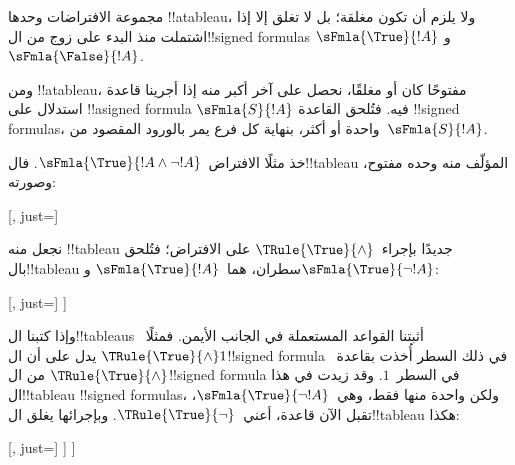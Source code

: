 \documentclass[../../../include/open-logic-section]{subfiles}
\begin{document}
\begin{ex}
  مجموعة الافتراضات وحدها !!a{tableau}، ولا يلزم أن تكون مغلقة؛
  بل لا تغلق إلا إذا اشتملت منذ البدء على زوج من ال!!{signed formula}s
  $\sFmla{\True}{!A}$ و$\sFmla{\False}{!A}$.

  ومن !!a{tableau}، مفتوحًا كان أو مغلقًا، نحصل على آخر أكبر منه
  إذا أجرينا قاعدة استدلال على !!a{signed formula}
  $\sFmla{S}{!A}$ فيه. فتُلحق القاعدة !!{signed formula}s، واحدة
  أو أكثر، بنهاية كل فرع يمر بالورود المقصود من~$\sFmla{S}{!A}$.


  خذ مثلًا الافتراض~$\sFmla{\True}{!A \land \lnot !A}$.
  فال!!{tableau} المؤلّف منه وحده مفتوح، وصورته:
  \begin{center}
    \begin{tableau}{}
      [, just=\TAss]
    \end{tableau}{}
  \end{center}
  نجعل منه !!{tableau} جديدًا بإجراء~$\TRule{\True}{\land}$
  على الافتراض؛ فتُلحق بال!!{tableau} سطران،
  هما~$\sFmla{\True}{!A}$ و$\sFmla{\True}{\lnot !A}$:
  \begin{center}
    \begin{tableau}{}
      [, just=\TAss
        [\sFmla{\True}{\formula{A}}, just={\TRule{\True}{\land}[1]},
          [\sFmla{\True}{\lnot \formula{A}}, just={\TRule{\True}{\land}[1]}
          ]
        ]
      ]
    \end{tableau}{}
  \end{center}
  وإذا كتبنا ال!!{tableau}s أثبتنا القواعد المستعملة في الجانب الأيمن.
  فمثلًا~$\TRule{\True}{\land} 1$ يدل على أن ال!!{signed formula}
  في ذلك السطر أُخذت بقاعدة~$\TRule{\True}{\land}$ من
  ال!!{signed formula} في السطر~$1$.
  وقد زيدت في هذا ال!!{tableau} !!{signed formula}s، ولكن واحدة
  منها فقط، وهي~$\sFmla{\True}{\lnot !A}$، تقبل الآن قاعدة،
  أعني~$\TRule{\True}{\lnot}$. وبإجرائها يغلق ال!!{tableau} هكذا:
  \begin{center}
    \begin{tableau}{}
      [, just=\TAss
        [\sFmla{\True}{\formula{A}}, just={\TRule{\True}{\land}[1]}
          [\sFmla{\True}{\lnot \formula{A}}, just={\TRule{\True}{\land}[1]}
            [\sFmla{\False}{\formula{A}}, just={\TRule{\True}{\lnot}[3]}, close]
          ]
        ]
      ]
    \end{tableau}{}
  \end{center}
\end{ex}
\end{document}
